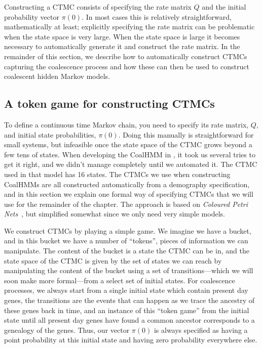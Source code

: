 \documentclass[graybox]{svmult}
\begin{document}
Constructing a CTMC consists of specifying the rate matrix $Q$ and the initial probability vector $\pi(0)$. In most cases this is relatively straightforward, mathematically at least; explicitly specifying the rate matrix can be problematic when the state space is very large. When the state space is large it becomes necessary to automatically generate it and construct the rate matrix. In the remainder of this section, we describe how to automatically construct CTMCs capturing the coalescence process and how these can then be used to construct coalescent hidden Markov models.

\subsection{A token game for constructing CTMCs}

To define a continuous time Markov chain, you need to specify its rate matrix, $Q$, and initial state probabilities, $\pi(0)$. Doing this manually is straightforward for small systems, but infeasible once the state space of the CTMC grows beyond a few tens of states. When developing the CoalHMM in \citet{Mailund:2011dva}, it took us several tries to get it right, and we didn't manage completely until we automated it. The CTMC used in that model has 16 states. The CTMCs we use when constructing CoalHMMs are all constructed automatically from a demography specification, and in this section we explain one formal way of specifying CTMCs that we will use for the remainder of the chapter. The approach is based on \emph{Coloured Petri Nets}~\cite{Jensen:2013jg}, but simplified somewhat since we only need very simple models.

We construct CTMCs by playing a simple game. We imagine we have a bucket, and in this bucket we have a number of ``tokens'', pieces of information we can manipulate. The content of the bucket is a state the CTMC can be in, and the state space of the CTMC is given by the set of states we can reach by manipulating the content of the bucket using a set of transitions---which we will soon make more formal---from a select set of initial states. For coalescence processes, we always start from a single initial state which contain present day genes, the transitions are the events that can happen as we trace the ancestry of these genes back in time, and an instance of this ``token game'' from the initial state until all present day genes have found a common ancestor corresponds to a genealogy of the genes. Thus, our vector $\pi(0)$ is always specified as having a point probability at this initial state and having zero probability everywhere else.
\end{document}
